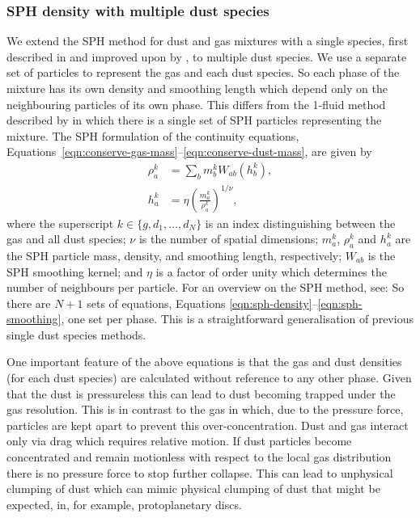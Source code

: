 \documentclass[fleqn,usenatbib]{mnras}
\begin{document}
\subsubsection{SPH density with multiple dust species}

We extend the SPH method for dust and gas mixtures with a single species, first
described in \citet{Monaghan1995CoPhC..87..225M} and improved upon by
\citet{Laibe2012MNRAS.420.2345L,Laibe2012MNRAS.420.2365L}, to multiple dust
species. We use a separate set of particles to represent the gas and each dust
species. So each phase of the mixture has its own density and smoothing length
which depend only on the neighbouring particles of its own phase. This differs
from the 1-fluid method described by \citet{Hutchison2018MNRAS.476.2186H} in
which there is a single set of SPH particles representing the mixture. The SPH
formulation of the continuity equations,
Equations~\ref{eqn:conserve-gas-mass}--\ref{eqn:conserve-dust-mass}, are given
by
%
\begin{align}
   \label{eqn:sph-density}
   \rho^k_a &= \sum_b m^k_b W_{ab}(h^k_b), \\
   h^k_a &= \eta \left(\frac{m^k_a}{\rho^k_a}\right)^{1/\nu},
   \label{eqn:sph-smoothing}
\end{align}
%
where the superscript \(k \in \{g, d_1, \dots, d_N\}\) is an index
distinguishing between the gas and all dust species; \(\nu\) is the number of
spatial dimensions; \(m^k_a\), \(\rho^k_a\) and \(h^k_a\) are the SPH particle
mass, density, and smoothing length, respectively; \(W_{ab}\) is the SPH
smoothing kernel; and \(\eta\) is a factor of order unity which determines the
number of neighbours per particle. For an overview on the SPH method, see:
\citet{Monaghan1992ARA&A..30..543M,Price2012JCoPh.231..759P}  So there are \(N +
1\) sets of equations, Equations \ref{eqn:sph-density}--\ref{eqn:sph-smoothing},
one set per phase. This is a straightforward generalisation of previous single
dust species methods.

One important feature of the above equations is that the gas and dust densities
(for each dust species) are calculated without reference to any other phase.
Given that the dust is pressureless this can lead to dust becoming trapped under
the gas resolution. This is in contrast to the gas in which, due to the pressure
force, particles are kept apart to prevent this over-concentration. Dust and gas
interact only via drag which requires relative motion. If dust particles become
concentrated and remain motionless with respect to the local gas distribution
there is no pressure force to stop further collapse. This can lead to unphysical
clumping of dust which can mimic physical clumping of dust that might be
expected, in, for example, protoplanetary discs.
\end{document}
